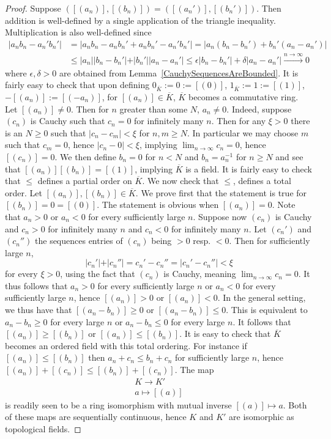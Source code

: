    \begin{proof}
        Suppose $([(a_n)],[(b_n)])=([(a_n')],[(b_n')])$. Then addition is well-defined by a single application of the triangle inequality. Multiplication is also well-defined since 
        \begin{align*}
            \vert a_nb_n - a_n'b_n'\vert &= \vert a_nb_n-a_nb_n'+a_nb_n' -a_n'b_n'\vert = \vert a_n(b_n-b_n')+ b_n'(a_n-a_n')\vert\\
            &\leq \vert a_n\vert \vert b_n-b_n'\vert +\vert b_n'\vert \vert a_n-a_n'\vert \leq \epsilon\vert b_n-b_n'\vert + \delta \vert a_n-a_n'\vert \overset{n\to \infty}{\to } 0  
        \end{align*}
        where $\epsilon,\delta>0$ are obtained from Lemma~\ref{CauchySequencesAreBounded}. It is fairly easy to check that upon defining $0_{\overline{K}} := 0 := [(0)]$, $1_{\overline{K}} := 1:= [(1)]$, $-[(a_n)]:= [(-a_n)]$, for $[(a_n)]\in \overline{K}$, $\overline{K}$ becomes a commutative ring. Let $[(a_n)]\neq 0$. Then for $n$ greater than some $N$, $a_n\neq 0$. Indeed, suppose $(c_n)$ is Cauchy such that $c_n=0$ for infinitely many $n$. Then for any $\xi>0$ there is an $N\geq 0$ such that $\vert c_n-c_m\vert <\xi$ for $n,m\geq N$. In particular we may choose $m$ such that $c_m=0$, hence $\vert c_n-0\vert <\xi$, implying $\lim_{n\to \infty} c_n=0$, hence $[(c_n)]=0$. We then define $b_n=0$ for $n<N$ and $b_n=a_n^{-1}$ for $n\geq N$ and see that $[(a_n)][(b_n)]=[(1)]$, implying $\overline{K}$ is a field. It is fairly easy to check that $\leq$ defines a partial order on $\overline{K}$. We now check that $\leq$, defines a total order. Let $[(a_n)],[(b_n)]\in \overline{K}$. We prove first that the statement is true for $[(b_n)]=0=[(0)]$. The statement is obvious when $[(a_n)]=0$. Note that $a_n>0$ or $a_n<0$ for every sufficiently large $n$. Suppose now $(c_n)$ is Cauchy and $c_n>0$ for infinitely many $n$ and $c_n<0$ for infinitely many $n$. Let $(c_n')$ and $(c_n'')$ the sequences entries of $(c_n)$ being $>0$ resp. $<0$. Then for sufficiently large $n$, $$\vert c_n'\vert +\vert c_n''\vert =c_n'-c_n''=\vert c_n'-c_n''\vert <\xi$$
        for every $\xi>0$, using the fact that $(c_n)$ is Cauchy, meaning $\lim_{n\to \infty} c_n = 0$. It thus follows that $a_n>0$ for every sufficiently large $n$ or $a_n<0$ for every sufficiently large $n$, hence $[(a_n)]>0$ or $[(a_n)]<0$. In the general setting, we thus have that $[(a_n-b_n)]\geq 0$ or $[(a_n-b_n)]\leq 0$. This is equivalent to $a_n-b_n\geq 0$ for every large $n$ or $a_n-b_n\leq 0$ for every large $n$. It follows that $[(a_n)]\geq [(b_n)]$ or $[(a_n)]\leq [(b_n)]$. It is easy to check that $\overline{K}$ becomes an ordered field with this total ordering. For instance if $[(a_n)]\leq [(b_n)]$ then $a_n+c_n\leq b_n+c_n$ for sufficiently large $n$, hence $[(a_n)]+[(c_n)]\leq [(b_n)]+[(c_n)]$. The map 
        \begin{gather*}
            K\rightarrow K'\\
            a \mapsto [(a)]
        \end{gather*}
        is readily seen to be a ring isomorphism with mutual inverse $[(a)]\mapsto a$. Both of these maps are sequentially continuous, hence $K$ and $K'$ are isomorphic as topological fields.   
    \end{proof}
